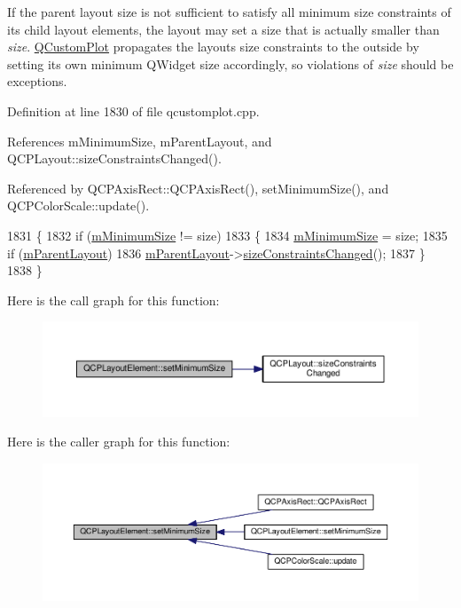 If the parent layout size is not sufficient to satisfy all minimum size constraints of its child layout elements, the layout may set a size that is actually smaller than {\itshape size}. \hyperlink{class_q_custom_plot}{Q\+Custom\+Plot} propagates the layout\textquotesingle{}s size constraints to the outside by setting its own minimum Q\+Widget size accordingly, so violations of {\itshape size} should be exceptions. 

Definition at line 1830 of file qcustomplot.\+cpp.



References m\+Minimum\+Size, m\+Parent\+Layout, and Q\+C\+P\+Layout\+::size\+Constraints\+Changed().



Referenced by Q\+C\+P\+Axis\+Rect\+::\+Q\+C\+P\+Axis\+Rect(), set\+Minimum\+Size(), and Q\+C\+P\+Color\+Scale\+::update().


\begin{DoxyCode}
1831 \{
1832   \textcolor{keywordflow}{if} (\hyperlink{class_q_c_p_layout_element_affef747c81632de33f08483b7fd10d01}{mMinimumSize} != size)
1833   \{
1834     \hyperlink{class_q_c_p_layout_element_affef747c81632de33f08483b7fd10d01}{mMinimumSize} = size;
1835     \textcolor{keywordflow}{if} (\hyperlink{class_q_c_p_layout_element_ae7c75c25549608bd688bdb65d4c38066}{mParentLayout})
1836       \hyperlink{class_q_c_p_layout_element_ae7c75c25549608bd688bdb65d4c38066}{mParentLayout}->\hyperlink{class_q_c_p_layout_a6218cd7e5c0e30077c1aeaffe55b6145}{sizeConstraintsChanged}();
1837   \}
1838 \}
\end{DoxyCode}


Here is the call graph for this function\+:\nopagebreak
\begin{figure}[H]
\begin{center}
\leavevmode
\includegraphics[width=350pt]{class_q_c_p_layout_element_a5dd29a3c8bc88440c97c06b67be7886b_cgraph}
\end{center}
\end{figure}




Here is the caller graph for this function\+:\nopagebreak
\begin{figure}[H]
\begin{center}
\leavevmode
\includegraphics[width=350pt]{class_q_c_p_layout_element_a5dd29a3c8bc88440c97c06b67be7886b_icgraph}
\end{center}
\end{figure}


